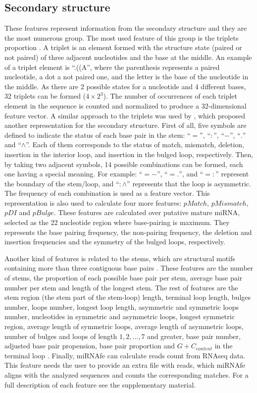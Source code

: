 \documentclass{article}
\begin{document}
\subsection{Secondary structure}
These features represent information from the secondary structure and they are the most numerous group. The most used feature of this group is the triplets 
proportion \citep{Xue05}. A triplet is an element formed with the structure state (paired or not paired) of three adjacent nucleotides and the base at the 
middle. An example of a triplet element is ``.((A'', where the parenthesis represents a paired nucleotide, a dot a not paired one, and the letter is the base 
of the nucleotide in the middle. As there are 2 possible states for a nucleotide and 4 different bases, 32 triplets can be formed ($4 \times 2^{3}$). The 
number of occurrences of each triplet element in the sequence is counted and normalized to produce a 32-­dimensional feature vector. A similar approach to the 
triplets was used by \cite{Huang07}, which proposed another representation for the secondary structure. First of all, five symbols are defined to indicate the 
status of each base pair in the stem: ``$=$'', ``$:$'', ``$-$'', ``$.$'' and ``$\wedge$''. Each of them corresponds to the status of match, mismatch, deletion, 
insertion in the interior loop, and insertion in the bulged loop, respectively. Then, by taking two adjacent symbols, 14 possible combinations can be formed, 
each one having a special meaning. For example: ``$=-$'', ``$=.$'', and ``$=:$'' represent the boundary of the stem/loop, and ``$:\wedge$'' represents that the 
loop is asymmetric. The frequency of each combination is used as a feature vector. This representation is also used to calculate four more features: $pMatch$, 
$pMismatch$, $pDI$ and $pBulge$. These features are calculated over putative mature miRNA, selected as the 22 nucleotide region where base-pairing is maximum. 
They represents the base pairing frequency, the non-pairing frequency, the deletion and insertion frequencies and the symmetry of the bulged loops, 
respectively.

Another kind of features is related to the stems, which are structural motifs containing more than three contiguous base pairs \citep{Ng07}. These features are 
the number of stems, the proportion of each possible base pair per stem, average base pair number per stem and length of the longest stem. %
The rest of features are the stem region (the stem part of the stem-loop) length, terminal loop length, bulges number, loops number, longest loop length, 
asymmetric and symmetric loops number, nucleotides in symmetric and asymmetric loops, longest symmetric region, average length of symmetric loops, average 
length of asymmetric loops, number of bulges and loops of length $1,2,...,7$ and greater, base pair number, adjusted base pair propension, base pair proportion 
and  $G+C_{content}$ in the terminal loop \citep{Lopes2014}. %
Finally, miRNAfe can calculate reads count from RNAseq data. This feature needs the user to provide an extra file with reads, which miRNAfe aligns with the 
analyzed sequences and counts the corresponding matches. For a full description of each feature see the supplementary material. %
\end{document}
